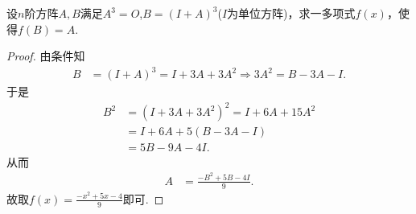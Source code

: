 \documentclass[../../main.tex]{subfiles}%
\begin{document}
\begin{example}
设$n$阶方阵$A,B$满足$A^3 = O$,$B = (I + A)^3$($I$为单位方阵)，求一多项式$f(x)$，使得$f(B) = A$.
\end{example}
\begin{proof}
由条件知
\begin{align*}
B&=(I + A)^3 = I + 3A + 3A^2\Longrightarrow 3A^2 = B - 3A - I.
\end{align*}
于是
\begin{align*}
B^2&=(I + 3A + 3A^2)^2 = I + 6A + 15A^2\\
&=I + 6A + 5(B - 3A - I)\\
&=5B - 9A - 4I.
\end{align*}
从而
\begin{align*}
A&=\frac{-B^2 + 5B - 4I}{9}.
\end{align*}
故取$f(x) = \frac{-x^2 + 5x - 4}{9}$即可.
\end{proof}
\end{document}
